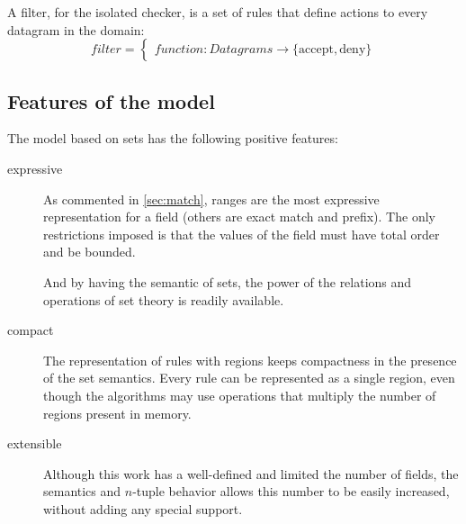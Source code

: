 A filter, for the isolated checker, is a set of rules that define actions to
every datagram in the domain:
\begin{equation*}
	filter =
	\begin{cases}
		function : Datagrams \rightarrow \{ \mbox{accept}, \mbox{deny} \}
	\end{cases}
\end{equation*}




\subsection{Features of the model}

The model based on sets has the following positive features:

\begin{description}
	\item[expressive] {
		As commented in \ref{sec:match}, ranges are the most expressive
		representation for a field (others are exact match and prefix). The only
		restrictions imposed is that the values of the field must have total
		order and be bounded.

		And by having the semantic of sets, the power of the relations and
		operations of set theory is readily available.
		}
	\item[compact] {
		The representation of rules with regions keeps compactness in the
		presence of the set semantics. Every rule can be represented as a single
		region, even though the algorithms may use operations that multiply the
		number of regions present in memory.
		}
	\item[extensible]{
		\label{extensible}
		Although this work has a well-defined and limited the number of fields, the
		semantics and $n$-tuple behavior allows this number to be
		easily increased, without adding any special support.
		}
\end{description}


